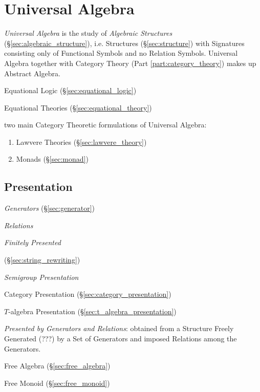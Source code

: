\section{Universal Algebra}\label{sec:universal_algebra}

\emph{Universal Algebra} is the study of \emph{Algebraic Structures}
(\S\ref{sec:algebraic_structure}), i.e. Structures (\S\ref{sec:structure}) with
Signatures consisting only of Functional Symbols and no Relation Symbols.
Universal Algebra together with Category Theory (Part
\ref{part:category_theory}) makes up Abstract Algebra.

Equational Logic (\S\ref{sec:equational_logic})

Equational Theories (\S\ref{sec:equational_theory})

two main Category Theoretic formulations of Universal Algebra:
\begin{enumerate}
  \item Lawvere Theories (\S\ref{sec:lawvere_theory})
  \item Monads (\S\ref{sec:monad})
\end{enumerate}



\subsection{Presentation}\label{sec:presentation}

\emph{Generators} (\S\ref{sec:generator})

\emph{Relations}

\emph{Finitely Presented}

(\S\ref{sec:string_rewriting})

\emph{Semigroup Presentation}

Category Presentation (\S\ref{sec:category_presentation})

$T$-algebra Presentation (\S\ref{sec:t_algebra_presentation})

\emph{Presented by Generators and Relations}: obtained from a Structure Freely
Generated (???) by a Set of Generators and imposed Relations among the
Generators.

Free Algebra (\S\ref{sec:free_algebra})

Free Monoid (\S\ref{sec:free_monoid})

